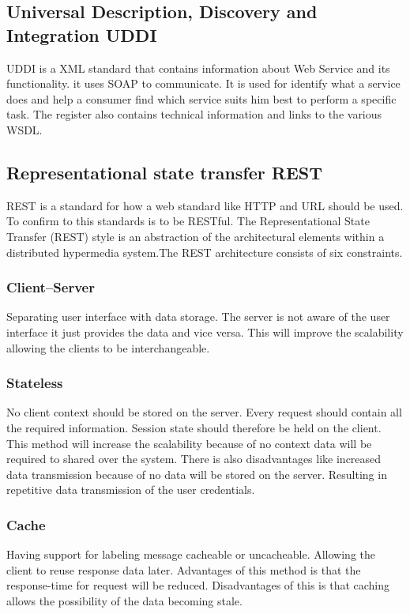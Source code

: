 \documentclass{llncs}
\begin{document}
\subsection{Universal Description, Discovery and Integration UDDI}
UDDI is a XML standard that contains information about Web Service and its functionality\cite{yang11}. it uses SOAP to communicate. It is used for identify what a service does and help a consumer find which service suits him best to perform a specific task. The register also contains technical information and links to the various WSDL.

\subsection{Representational state transfer REST}
REST is a standard for how a web standard like HTTP and URL should be used. To confirm to this standards is to be RESTful. The Representational State Transfer (REST) style is an abstraction of the architectural elements within a distributed hypermedia system\cite{rest}.The REST architecture consists of six constraints. 

\subsubsection{Client–Server}
Separating user interface with data storage. The server is not aware of the user interface it just provides the data and vice versa. This will improve the scalability allowing the clients to be interchangeable.

\subsubsection{Stateless}
No client context should be stored on the server. Every request should contain all the required information. Session state should therefore be held on the client. This method will increase the scalability because of no context data will be required to shared over the system. There is also disadvantages like increased data transmission because of no data will be stored on the server. Resulting in repetitive data transmission of the user credentials.

\subsubsection{Cache}
Having support for labeling message cacheable or uncacheable. Allowing the client  to reuse response data later. Advantages of this method is that the response-time for request will be reduced. Disadvantages of this is that caching allows the possibility of the data becoming stale.
\end{document}
